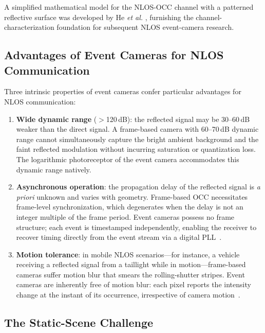 \documentclass[10pt,a4paper]{article}
\begin{document}
A simplified mathematical model for the NLOS-OCC channel with a
patterned reflective surface was developed by He \emph{et al.}
\cite{he2023nlosmodel}, furnishing the channel-characterization
foundation for subsequent NLOS event-camera research.

\subsection{Advantages of Event Cameras for NLOS Communication}
\label{sec:why}

Three intrinsic properties of event cameras confer particular advantages
for NLOS communication:
\begin{enumerate}
  \item \textbf{Wide dynamic range} ($>$120\,dB): the reflected signal
    may be 30--60\,dB weaker than the direct signal. A frame-based
    camera with 60--70\,dB dynamic range cannot simultaneously capture
    the bright ambient background and the faint reflected modulation
    without incurring saturation or quantization loss. The logarithmic
    photoreceptor of the event camera accommodates this dynamic range
    natively.
  \item \textbf{Asynchronous operation}: the propagation delay of the
    reflected signal is \emph{a priori} unknown and varies with
    geometry. Frame-based OCC necessitates frame-level synchronization,
    which degenerates when the delay is not an integer multiple of the
    frame period. Event cameras possess no frame structure; each event
    is timestamped independently, enabling the receiver to recover
    timing directly from the event stream via a digital
    PLL~\cite{sumino2025longrange, nardo2026longrange}.
  \item \textbf{Motion tolerance}: in mobile NLOS scenarios---for
    instance, a vehicle receiving a reflected signal from a taillight
    while in motion---frame-based cameras suffer motion blur that smears
    the rolling-shutter stripes. Event cameras are inherently free of
    motion blur: each pixel reports the intensity change at the instant
    of its occurrence, irrespective of camera
    motion~\cite{su2025motionaware}.
\end{enumerate}

\subsection{The Static-Scene Challenge}
\label{sec:static}
\end{document}

